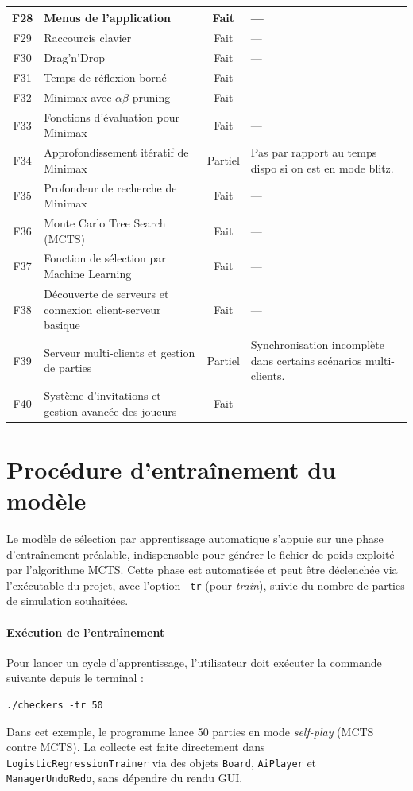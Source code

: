 \documentclass[a4paper]{article}
\begin{document}
\begin{longtable}{|c|p{7.3cm}|c|p{5.2cm}|}
F28 & Menus de l’application & Fait & --- \\ \hline
F29 & Raccourcis clavier & Fait & --- \\ \hline
F30 & Drag’n’Drop & Fait & --- \\ \hline
F31 & Temps de réflexion borné & Fait & --- \\ \hline
F32 & Minimax avec $\alpha\beta$-pruning & Fait & --- \\ \hline
F33 & Fonctions d’évaluation pour Minimax & Fait & --- \\ \hline
F34 & Approfondissement itératif de Minimax & Partiel & Pas par rapport au temps dispo si on est en mode blitz. \\ \hline
F35 & Profondeur de recherche de Minimax & Fait & --- \\ \hline
F36 & Monte Carlo Tree Search (MCTS) & Fait & --- \\ \hline
F37 & Fonction de sélection par Machine Learning & Fait & --- \\ \hline
F38 & Découverte de serveurs et connexion client-serveur basique & Fait & --- \\ \hline
F39 & Serveur multi-clients et gestion de parties & Partiel & Synchronisation incomplète dans certains scénarios multi-clients. \\ \hline
F40 & Système d’invitations et gestion avancée des joueurs & Fait & --- \\ \hline
\end{longtable} 

\section{Procédure d'entraînement du modèle}
\label{sec:annexe-procedure-entrainement}

Le modèle de sélection par apprentissage automatique s'appuie sur une phase d'entraînement préalable, indispensable pour générer
 le fichier de poids exploité par l'algorithme MCTS. Cette phase est automatisée et peut être déclenchée via l'exécutable du projet, avec l'option
 \texttt{-tr} (pour \textit{train}), suivie du nombre de parties de simulation souhaitées.

\paragraph{Exécution de l'entraînement}
Pour lancer un cycle d'apprentissage, l'utilisateur doit exécuter la commande suivante depuis le terminal :
\begin{verbatim}
./checkers -tr 50
\end{verbatim}
Dans cet exemple, le programme lance 50 parties en mode \textit{self-play} (MCTS contre MCTS). La collecte est faite directement dans
\texttt{LogisticRegressionTrainer} via des objets \texttt{Board}, \texttt{AiPlayer} et \texttt{ManagerUndoRedo}, sans dépendre du rendu GUI.
\end{document}
